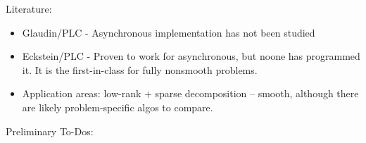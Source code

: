 \documentclass[a4paper,11pt,fleqn]{article}
\theoremstyle{plain}{\theorembodyfont{\rmfamily}%
\newtheorem{conjecture}[theorem]{Conjecture}}
\theoremstyle{plain}{\theorembodyfont{\rmfamily}%
\newtheorem{example}[theorem]{Example}}
\theoremstyle{plain}{\theorembodyfont{\rmfamily}%
\newtheorem{remark}[theorem]{Remark}}
\theoremstyle{plain}{\theorembodyfont{\rmfamily}%
\newtheorem{algorithm}[theorem]{Algorithm}}
\theoremstyle{plain}{\theorembodyfont{\rmfamily}%
\newtheorem{condition}[theorem]{Condition}}
\theoremstyle{plain}{\theorembodyfont{\rmfamily}%
\newtheorem{definition}[theorem]{Definition}}
\theoremstyle{plain}{\theorembodyfont{\rmfamily}
\newtheorem{fact}[theorem]{Fact}}
\theoremstyle{plain}{\theorembodyfont{\rmfamily}
\newtheorem{problem}[theorem]{Problem}}
\theoremstyle{plain}{\theorembodyfont{\rmfamily}
\newtheorem{notation}[theorem]{Notation}}
\theoremstyle{plain}{\theorembodyfont{\rmfamily}
\newtheorem{project}[theorem]{Project}}
\begin{document}

Literature:
\begin{itemize}
\item
Glaudin/PLC - Asynchronous implementation has not been studied
\item
Eckstein/PLC - Proven to work for asynchronous, but noone has
programmed it. It is the first-in-class for fully nonsmooth
problems.
\item
Application areas:
low-rank + sparse decomposition -- smooth, although there are
likely problem-specific algos to compare.
\end{itemize}

Preliminary To-Dos:
\end{document}
